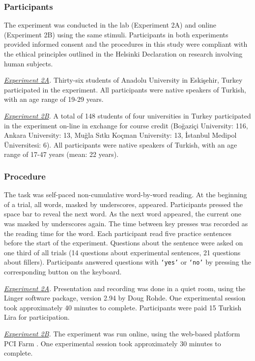 \documentclass[english, doc]{apa7}\usepackage[]{graphicx}\usepackage[]{color}
\begin{document}
\subsubsection{Participants}

The experiment was conducted in the lab (Experiment 2A) and online  (Experiment 2B) using the same stimuli. 
Participants in both experiments provided informed consent and the procedures in this study were compliant with the ethical principles outlined in the Helsinki Declaration on research involving human subjects.

\emph{\uline{Experiment 2A}.}
Thirty-six students of Anadolu University in Eskişehir, Turkey participated in the experiment. All participants were native speakers of Turkish, with an age range of 19-29 years. 

\emph{\uline{Experiment 2B}.}
A total of 148 students of four universities in Turkey participated in the experiment on-line in exchange for course credit (Boğaziçi University: 116, Ankara University: 13, Muğla Sıtkı Koçman University: 13, İstanbul Medipol Üniversitesi: 6). 
All participants were native speakers of Turkish, with an age range of 17-47 years (mean: 22 years). 



\subsubsection{Procedure}
The task was self-paced non-cumulative word-by-word reading. At the beginning of a trial, all words, masked by underscores, appeared. Participants pressed the space bar to reveal the next word. As the next word appeared, the current one was masked by underscores again. The time between key presses was recorded as the reading time for the word.
%
Each participant read five practice sentences before the start of the experiment.
Questions about the sentence were asked on one third of all trials (14 questions about experimental sentences, 21 questions about fillers). Participants answered questions with \texttt{`yes'} or \texttt{`no'} by pressing the corresponding button on the keyboard.

\emph{\uline{Experiment 2A}.}
Presentation and recording was done in a quiet room, using the Linger software package, version 2.94 by Doug Rohde. One experimental session took approximately 40 minutes to complete. Participants were paid 15 Turkish Lira for participation.

\emph{\uline{Experiment 2B}.}
The experiment was run online, using the web-based platform PCI Farm \citep{pcibex}. One experimental session took approximately 30 minutes to complete. 
\end{document}
